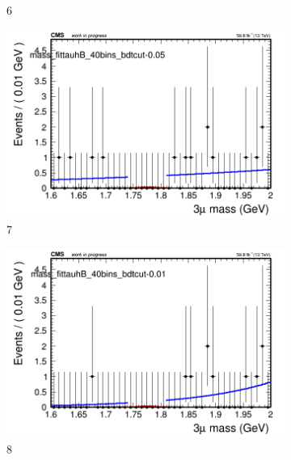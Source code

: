 \begin{figure}[h!]
\begin{subfigure}{0.2\textwidth}
        \caption{6}
    \end{subfigure}
    \begin{subfigure}{0.2\textwidth}
        \includegraphics[width=\textwidth]{unfixed_exp/plots/tauhB/massfit_tauhB_40bins_bdtcut-0.05.png}
        \caption{7}
    \end{subfigure}
    \begin{subfigure}{0.2\textwidth}
        \includegraphics[width=\textwidth]{unfixed_exp/plots/tauhB/massfit_tauhB_40bins_bdtcut-0.01.png}
        \caption{8}
    \end{subfigure}
    \begin{subfigure}{0.2\textwidth}

\end{subfigure}
\end{figure}
